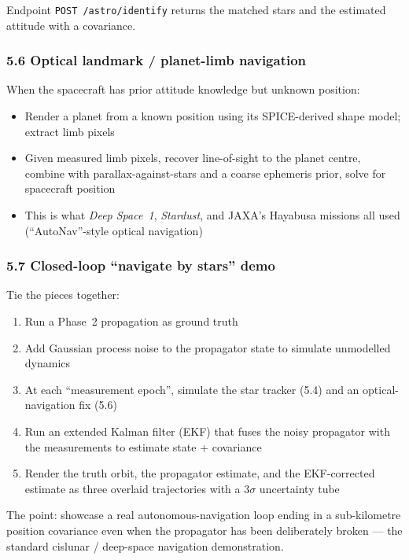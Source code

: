 \documentclass[11pt, a4paper]{article}
\begin{document}
Endpoint \texttt{POST /astro/identify} returns the matched stars and the
estimated attitude with a covariance.

\subsubsection{5.6 Optical landmark / planet-limb navigation}

When the spacecraft has prior attitude knowledge but unknown position:

\begin{itemize}[leftmargin=*]
  \item Render a planet from a known position using its SPICE-derived shape
        model; extract limb pixels
  \item Given measured limb pixels, recover line-of-sight to the planet
        centre, combine with parallax-against-stars and a coarse
        ephemeris prior, solve for spacecraft position
  \item This is what \emph{Deep Space~1}, \emph{Stardust}, and JAXA's
        Hayabusa missions all used (``AutoNav''-style optical navigation)
\end{itemize}

\subsubsection{5.7 Closed-loop ``navigate by stars'' demo}

Tie the pieces together:

\begin{enumerate}[leftmargin=*]
  \item Run a Phase~2 propagation as ground truth
  \item Add Gaussian process noise to the propagator state to simulate
        unmodelled dynamics
  \item At each ``measurement epoch'', simulate the star tracker (5.4)
        and an optical-navigation fix (5.6)
  \item Run an extended Kalman filter (EKF) that fuses the noisy
        propagator with the measurements to estimate state + covariance
  \item Render the truth orbit, the propagator estimate, and the
        EKF-corrected estimate as three overlaid trajectories with a
        $3\sigma$ uncertainty tube
\end{enumerate}

The point: showcase a real autonomous-navigation loop ending in a
sub-kilometre position covariance even when the propagator has been
deliberately broken --- the standard cislunar / deep-space navigation
demonstration.
\end{document}
